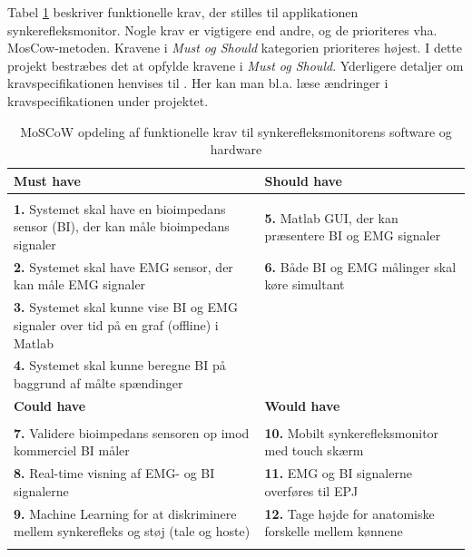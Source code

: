 Tabel \ref{tab:moscow} beskriver funktionelle krav, der stilles til applikationen synkerefleksmonitor. Nogle krav er vigtigere end andre, og de prioriteres vha. MosCow-metoden. Kravene i \textit{Must og Should} kategorien prioriteres højest.  I dette projekt bestræbes det at opfylde kravene i \textit{Must og Should}. Yderligere detaljer om kravspecifikationen henvises til . Her kan man bl.a. læse ændringer i kravspecifikationen under projektet. 

\begin{table}[H]

\begin{tabularx}{\textwidth}{X|X}
\rowcolor{Gray}
\toprule
\textbf{Must have} & \textbf{Should have} \\
\hline \\
\textbf{1. }Systemet skal have en bioimpedans sensor (BI), der kan måle bioimpedans signaler & \textbf{5. }Matlab GUI, der kan præsentere BI og EMG signaler \\[4ex]
\textbf{2. }Systemet skal have EMG sensor, der kan måle EMG signaler & \textbf{6. }Både BI og EMG målinger skal køre simultant\\[4ex]
\textbf{3. }Systemet skal kunne vise BI og EMG signaler over tid på en graf (offline) i Matlab  & \\[4ex]
\textbf{4. }Systemet skal kunne beregne BI på baggrund af målte spændinger & \\[4ex]


\midrule
    \rowcolor{Gray}
    \textbf{Could have} & \textbf{Would have}\\
    \midrule \\
    \textbf{7. }Validere bioimpedans sensoren op imod kommerciel BI måler & \textbf{10. }Mobilt synkerefleksmonitor med touch skærm\\[4ex]
\textbf{8. }Real-time visning af EMG- og BI signalerne & \textbf{11. }EMG og BI signalerne overføres til EPJ  \\[4ex]
\textbf{9. }Machine Learning for at diskriminere mellem synkerefleks og støj (tale og hoste)& \textbf{12. }Tage højde for anatomiske forskelle mellem kønnene\\[4ex]
& \\

\end{tabularx}

\caption{MoSCoW opdeling af funktionelle krav til  synkerefleksmonitorens software og hardware}
  \label{tab:moscow}
\end{table}

